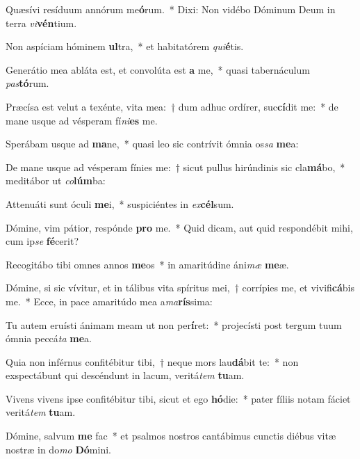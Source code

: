 \item Quæsívi resíduum annórum me\textbf{ó}rum.~* Dixi: Non vidébo Dóminum Deum in terra \textit{vi}\textbf{vén}tium.
\item Non aspíciam hóminem \textbf{ul}tra,~* et habitatórem \textit{qui}\textbf{é}tis.
\item Generátio mea abláta est, et convolúta est \textbf{a} me,~* quasi tabernáculum \textit{pas}\textbf{tó}rum.
\item Præcísa est velut a texénte, vita mea:~† dum adhuc ordírer, suc\textbf{cí}dit me:~* de mane usque ad vésperam fí\textit{ni}\textbf{es} me.
\item Sperábam usque ad \textbf{ma}ne,~* quasi leo sic contrívit ómnia os\textit{sa} \textbf{me}a:
\item De mane usque ad vésperam fínies me:~† sicut pullus hirúndinis sic cla\textbf{má}bo,~* meditábor ut \textit{co}\textbf{lúm}ba:
\item Attenuáti sunt óculi \textbf{me}i,~* suspiciéntes in \textit{ex}\textbf{cél}sum.
\item Dómine, vim pátior, respónde \textbf{pro} me.~* Quid dicam, aut quid respondébit mihi, cum ip\textit{se} \textbf{fé}cerit?
\item Recogitábo tibi omnes annos \textbf{me}os~* in amaritúdine áni\textit{mæ} \textbf{me}æ.
\item Dómine, si sic vívitur, et in tálibus vita spíritus mei,~† corrípies me, et vivifi\textbf{cá}bis me.~* Ecce, in pace amaritúdo mea a\textit{ma}\textbf{rís}sima:
\item Tu autem eruísti ánimam meam ut non per\textbf{í}ret:~* projecísti post tergum tuum ómnia peccá\textit{ta} \textbf{me}a.
\item Quia non inférnus confitébitur tibi,~† neque mors lau\textbf{dá}bit te:~* non exspectábunt qui descéndunt in lacum, veritá\textit{tem} \textbf{tu}am.
\item Vivens vivens ipse confitébitur tibi, sicut et ego \textbf{hó}die:~* pater fíliis notam fáciet veritá\textit{tem} \textbf{tu}am.
\item Dómine, salvum \textbf{me} fac~* et psalmos nostros cantábimus cunctis diébus vitæ nostræ in do\textit{mo} \textbf{Dó}mini.
